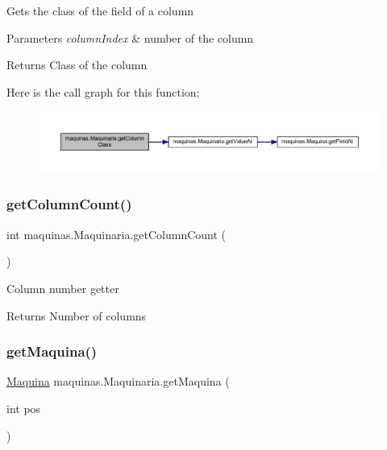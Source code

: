 Gets the class of the field of a column 
\begin{DoxyParams}{Parameters}
{\em column\+Index} & number of the column \\
\hline
\end{DoxyParams}
\begin{DoxyReturn}{Returns}
Class of the column 
\end{DoxyReturn}
Here is the call graph for this function\+:
\nopagebreak
\begin{figure}[H]
\begin{center}
\leavevmode
\includegraphics[width=350pt]{classmaquinas_1_1_maquinaria_ae792351e004fa5f3d10900e33f10186d_cgraph}
\end{center}
\end{figure}
\mbox{\label{classmaquinas_1_1_maquinaria_a4d573c7762633b39ef7305ecb1b6ffa3}} 
\subsubsection{\texorpdfstring{get\+Column\+Count()}{getColumnCount()}}
{\footnotesize\ttfamily int maquinas.\+Maquinaria.\+get\+Column\+Count (\begin{DoxyParamCaption}{ }\end{DoxyParamCaption})}

Column number getter \begin{DoxyReturn}{Returns}
Number of columns 
\end{DoxyReturn}
\mbox{\label{classmaquinas_1_1_maquinaria_a438161cbcee58e47e57c1c1f0d0207eb}} 
\subsubsection{\texorpdfstring{get\+Maquina()}{getMaquina()}}
{\footnotesize\ttfamily \mbox{\hyperlink{classmaquinas_1_1_maquina}{Maquina}} maquinas.\+Maquinaria.\+get\+Maquina (\begin{DoxyParamCaption}\item[{int}]{pos }\end{DoxyParamCaption})}

